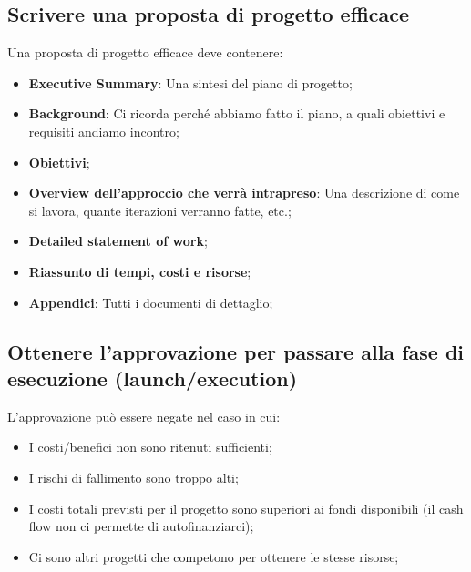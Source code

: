 \subsection{Scrivere una proposta di progetto efficace}
Una proposta di progetto efficace deve contenere:
\begin{itemize}
	\item \textbf{Executive Summary}: Una sintesi del piano di progetto;
	\item \textbf{Background}: Ci ricorda perché abbiamo fatto il piano, a quali obiettivi e requisiti andiamo incontro;
	\item \textbf{Obiettivi};
	\item \textbf{Overview dell'approccio che verrà intrapreso}: Una descrizione di come si lavora, quante iterazioni verranno fatte, etc.;
	\item \textbf{Detailed statement of work};
	\item \textbf{Riassunto di tempi, costi e risorse};
	\item \textbf{Appendici}: Tutti i documenti di dettaglio;
\end{itemize}
\subsection{Ottenere l’approvazione per passare alla fase di esecuzione (launch/execution)}
L'approvazione può essere negate nel caso in cui:
\begin{itemize}
	\item I costi/benefici non sono ritenuti sufficienti;
	\item I rischi di fallimento sono troppo alti;
	\item I costi totali previsti per il progetto sono superiori ai fondi disponibili (il cash flow non ci permette di autofinanziarci);
	\item Ci sono altri progetti che competono per ottenere le stesse risorse;
\end{itemize}
